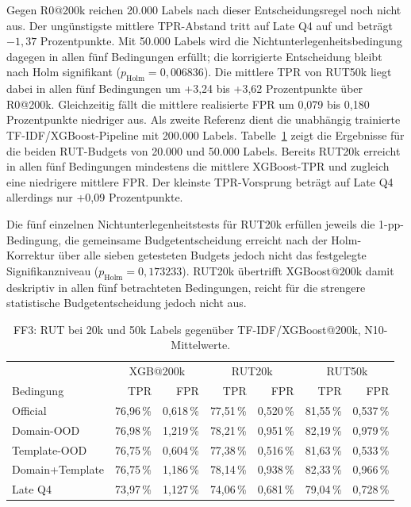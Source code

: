 Gegen R0@200k reichen 20.000 Labels nach dieser Entscheidungsregel noch nicht aus. Der
ungünstigste mittlere TPR-Abstand tritt auf Late Q4 auf und beträgt $-1{,}37$
Prozentpunkte. Mit 50.000 Labels wird die Nichtunterlegenheitsbedingung dagegen in allen fünf
Bedingungen erfüllt; die korrigierte Entscheidung bleibt nach Holm signifikant
($p_{\mathrm{Holm}}=0{,}006836$). Die mittlere TPR von RUT50k liegt dabei in allen fünf
Bedingungen um +3,24 bis +3,62 Prozentpunkte über R0@200k. Gleichzeitig fällt die mittlere
realisierte FPR um 0,079 bis 0,180 Prozentpunkte niedriger aus. Als zweite Referenz dient die unabhängig trainierte TF-IDF/XGBoost-Pipeline mit 200.000
Labels. Tabelle~\ref{tab:ff3_xgb} zeigt die Ergebnisse für die beiden RUT-Budgets von 20.000
und 50.000 Labels. Bereits RUT20k erreicht in allen fünf Bedingungen mindestens die mittlere
XGBoost-TPR und zugleich eine niedrigere mittlere FPR. Der kleinste TPR-Vorsprung beträgt
auf Late Q4 allerdings nur +0,09 Prozentpunkte.

Die fünf einzelnen Nichtunterlegenheitstests für RUT20k erfüllen jeweils die
1-pp-Bedingung, die gemeinsame Budgetentscheidung erreicht nach der Holm-Korrektur über
alle sieben getesteten Budgets jedoch nicht das festgelegte Signifikanzniveau
($p_{\mathrm{Holm}}=0{,}173233$). RUT20k übertrifft XGBoost@200k damit deskriptiv in allen
fünf betrachteten Bedingungen, reicht für die strengere statistische Budgetentscheidung jedoch
nicht aus.

\begin{table}[htbp]
\centering
\caption{FF3: RUT bei 20k und 50k Labels gegenüber TF-IDF/XGBoost@200k, N10-Mittelwerte.}
\label{tab:ff3_xgb}
\small
\begin{tabular}{lrrrrrr}
\toprule
 & \multicolumn{2}{c}{XGB@200k} & \multicolumn{2}{c}{RUT20k} & \multicolumn{2}{c}{RUT50k} \\
Bedingung & TPR & FPR & TPR & FPR & TPR & FPR \\
\midrule
Official & 76,96\,\% & 0,618\,\% & 77,51\,\% & 0,520\,\% & 81,55\,\% & 0,537\,\% \\
Domain-OOD & 76,98\,\% & 1,219\,\% & 78,21\,\% & 0,951\,\% & 82,19\,\% & 0,979\,\% \\
Template-OOD & 76,75\,\% & 0,604\,\% & 77,38\,\% & 0,516\,\% & 81,63\,\% & 0,533\,\% \\
Domain+Template & 76,75\,\% & 1,186\,\% & 78,14\,\% & 0,938\,\% & 82,33\,\% & 0,966\,\% \\
Late Q4 & 73,97\,\% & 1,127\,\% & 74,06\,\% & 0,681\,\% & 79,04\,\% & 0,728\,\% \\
\bottomrule
\end{tabular}
\end{table}

